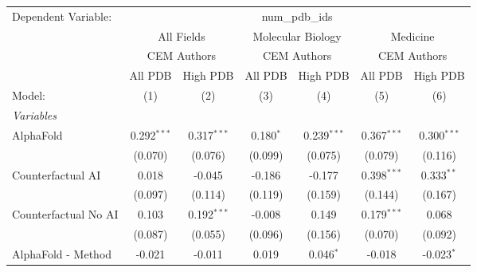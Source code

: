 \begingroup
\centering
\begin{tabular}{lcccccc}
   \tabularnewline \midrule \midrule
   Dependent Variable: & \multicolumn{6}{c}{num\_pdb\_ids}\\
 & \multicolumn{2}{c}{All Fields} & \multicolumn{2}{c}{Molecular Biology} & \multicolumn{2}{c}{Medicine} \\
\cmidrule(lr){2-3} \cmidrule(lr){4-5} \cmidrule(lr){6-7}
 & \multicolumn{2}{c}{CEM Authors} & \multicolumn{2}{c}{CEM Authors} & \multicolumn{2}{c}{CEM Authors} \\
\cmidrule(lr){2-3} \cmidrule(lr){4-5} \cmidrule(lr){6-7}
 & \multicolumn{1}{c}{All PDB} & \multicolumn{1}{c}{High PDB} & \multicolumn{1}{c}{All PDB} & \multicolumn{1}{c}{High PDB} & \multicolumn{1}{c}{All PDB} & \multicolumn{1}{c}{High PDB} \\
\cmidrule(lr){2-2} \cmidrule(lr){3-3} \cmidrule(lr){4-4} \cmidrule(lr){5-5} \cmidrule(lr){6-6} \cmidrule(lr){7-7}
   Model:                                                     & (1)            & (2)           & (3)            & (4)           & (5)           & (6)\\  
   \midrule
   \emph{Variables}\\
   AlphaFold                                                  & 0.292$^{***}$  & 0.317$^{***}$ & 0.180$^{*}$    & 0.239$^{***}$ & 0.367$^{***}$ & 0.300$^{***}$\\   
                                                              & (0.070)        & (0.076)       & (0.099)        & (0.075)       & (0.079)       & (0.116)\\   
   Counterfactual AI                                          & 0.018          & -0.045        & -0.186         & -0.177        & 0.398$^{***}$ & 0.333$^{**}$\\   
                                                              & (0.097)        & (0.114)       & (0.119)        & (0.159)       & (0.144)       & (0.167)\\   
   Counterfactual No AI                                       & 0.103          & 0.192$^{***}$ & -0.008         & 0.149         & 0.179$^{***}$ & 0.068\\   
                                                              & (0.087)        & (0.055)       & (0.096)        & (0.156)       & (0.070)       & (0.092)\\   
   AlphaFold - Method                                         & -0.021         & -0.011        & 0.019          & 0.046$^{*}$   & -0.018        & -0.023$^{*}$\\   

\end{tabular}
